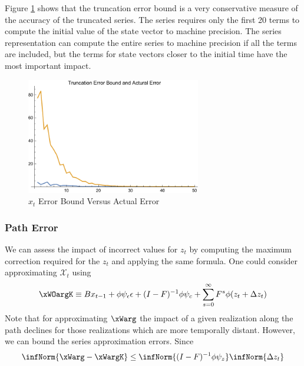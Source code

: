 \documentclass[12pt]{article}
\begin{document}
 Figure \ref{figArbTrunc} shows
that the truncation error bound is a very conservative measure of the accuracy
of the truncated series.  The series requires only the first 20 terms to compute
the initial value of the state vector to machine precision. 
The series representation can compute the entire series to machine precision
if all the terms are included, but the terms for state vectors closer 
to the initial time have the most important impact.


\begin{figure}
  \centering


\includegraphics[width=3in]{arbTruncErr.pdf}  
  \caption{$x_t$ Error Bound Versus Actual Error} \label{figArbTrunc}

\end{figure}

\subsubsection{Path Error}


We can assess the impact of incorrect values for $z_t$ by computing the maximum correction required for the $z_t$ and applying the 
same formula.
One could consider approximating $\mathcal{X}_t$ using
 	 \begin{gather}
 	 \xWOargK \equiv B x_{t-1}+ \phi \psi_\epsilon\epsilon  + (I - F)^{-1} \phi \psi_c + \sum_{s=0}^\infty F^s \phi (z_{t}+\Delta z_{t})\label{theDeltaSeries}
 \end{gather}
Note that for approximating $\xWarg$ the impact of  a given realization along the path declines for those realizations which are  more temporally distant.
However, we can bound the  series approximation  errors.
Since
    \begin{gather}
      \label{eq:1}
\infNorm{\xWarg-\xWargK} \le \infNorm{(I -F)^{-1} \phi \psi_z}  \infNorm{\Delta z_t } 
    \end{gather}


\label{sec:pathnorm}
\end{document}
